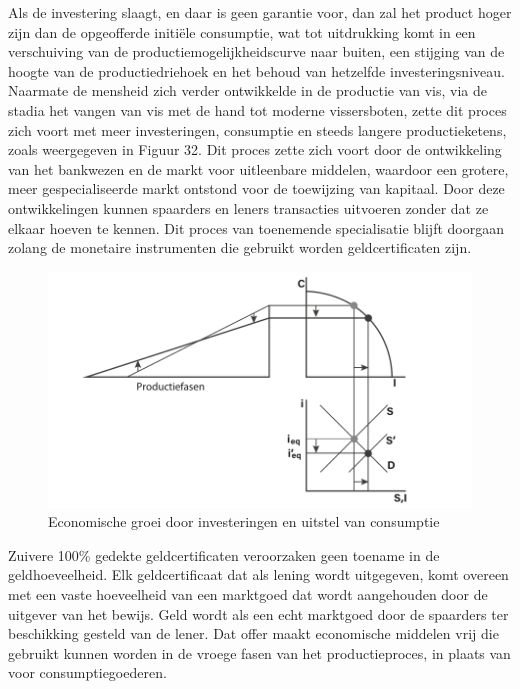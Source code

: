 Als de investering slaagt, en daar is geen garantie voor, dan zal het product hoger zijn dan de opgeofferde initiële consumptie, wat tot uitdrukking komt in een verschuiving van de productiemogelijkheidscurve naar buiten, een stijging van de hoogte van de productiedriehoek en het behoud van hetzelfde investeringsniveau. Naarmate de mensheid zich verder ontwikkelde in de productie van vis, via de stadia het vangen van vis met de hand tot moderne vissersboten, zette dit proces zich voort met meer investeringen, consumptie en steeds langere productieketens, zoals weergegeven in Figuur 32. Dit proces zette zich voort door de ontwikkeling van het bankwezen en de markt voor uitleenbare middelen, waardoor een grotere, meer gespecialiseerde markt ontstond voor de toewijzing van kapitaal. Door deze ontwikkelingen kunnen spaarders en leners transacties uitvoeren zonder dat ze elkaar hoeven te kennen. Dit proces van toenemende specialisatie blijft doorgaan zolang de monetaire instrumenten die gebruikt worden geldcertificaten zijn.

\begin{figure}
    \centering
    \includegraphics[width=\textwidth]{figures/fig32-1.png}
    \caption[Economische groei door investeringen en uitstel van consumptie]{Economische groei door investeringen en uitstel van consumptie}
    \label{fig32}
\end{figure}

Zuivere 100\% gedekte geldcertificaten veroorzaken geen toename in de geldhoeveelheid. Elk geldcertificaat dat als lening wordt uitgegeven, komt overeen met een vaste hoeveelheid van een marktgoed dat wordt aangehouden door de uitgever van het bewijs. Geld wordt als een echt marktgoed door de spaarders ter beschikking gesteld van de lener. Dat offer maakt economische middelen vrij die gebruikt kunnen worden in de vroege fasen van het productieproces, in plaats van voor consumptiegoederen.

